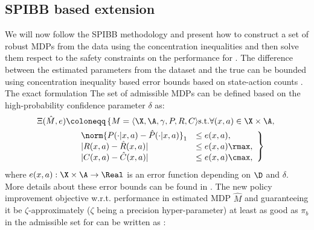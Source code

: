 \subsection{SPIBB based extension}
\label{sec:spibb-w-constraints}



We will now follow the SPIBB methodology and present how to construct a set of robust MDPs from the data using the concentration inequalities and then solve them respect to the safety constraints on the performance for . 
The difference between the estimated parameters from the dataset and the true can be bounded using concentration inequality based error bounds based on state-action counts \citep{ghavamzadeh2016safe}. The exact formulation The set of admissible MDPs can be defined based on the high-probability confidence parameter $\delta$ as:
\begin{align*}
    \Xi(\hat{M}, e) &\coloneqq \left\{
                M = \langle \X, \A, \gamma, P, R, C \rangle \text{s.t.} \forall (x,a) \in \X \times \A, \right.\\ 
                &\quad \left.
                \begin{array}{lll}
                  \norm{P(\cdot|x,a) - \hat{P}(\cdot|x,a)}_{1} &\leq e(x,a), \\
                  |R(x,a) - \hat{R}(x,a)| &\leq e(x,a) \rmax , \\
                |C(x,a) - \hat{C}(x,a)| &\leq e(x,a) \cmax, 
                \end{array}
                 \right\}
\end{align*}
where $e(x,a): \X \times \A \rightarrow \Real$ is an error function depending on $\D$ and $\delta$.  More details about these error bounds can be found in . The new policy improvement objective w.r.t. performance in estimated MDP $\hat{M}$ and guaranteeing it be $\zeta$-approximately ($\zeta$ being a precision hyper-parameter) at least as good as $\pi_b$ in the admissible set for  can be written as :
